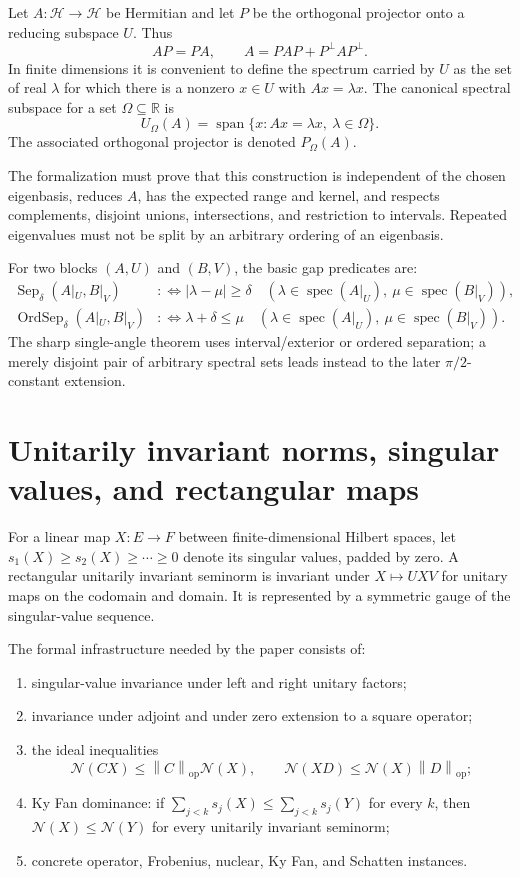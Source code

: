 \documentclass[11pt]{article}
\newcommand{\Hh}{\mathcal H}
\newcommand{\Nn}{\mathcal N}
\newcommand{\spec}{\operatorname{spec}}
\newcommand{\op}{\mathrm{op}}
\newcommand{\abs}[1]{\left|#1\right|}
\newcommand{\norm}[1]{\left\lVert#1\right\rVert}
\theoremstyle{remark}
\begin{document}
Let \(A:\Hh\to\Hh\) be Hermitian and let \(P\) be the orthogonal projector
onto a reducing subspace \(U\).  Thus
\[
  AP=PA, \qquad A=PAP+P^\perp A P^\perp.
\]
In finite dimensions it is convenient to define the spectrum carried by
\(U\) as the set of real \(\lambda\) for which there is a nonzero
\(x\in U\) with \(Ax=\lambda x\).  The canonical spectral subspace for a set
\(\Omega\subseteq\mathbb R\) is
\[
  U_\Omega(A)=\operatorname{span}\{x:Ax=\lambda x,\ \lambda\in\Omega\}.
\]
The associated orthogonal projector is denoted \(P_\Omega(A)\).

The formalization must prove that this construction is independent of the
chosen eigenbasis, reduces \(A\), has the expected range and kernel, and
respects complements, disjoint unions, intersections, and restriction to
intervals.  Repeated eigenvalues must not be split by an arbitrary ordering of
an eigenbasis.

For two blocks \((A,U)\) and \((B,V)\), the basic gap predicates are:
\begin{align*}
  \operatorname{Sep}_\delta(A|_U,B|_V)
    &:\Longleftrightarrow
      \abs{\lambda-\mu}\ge\delta
      \quad(\lambda\in\spec(A|_U),\ \mu\in\spec(B|_V)),\\
  \operatorname{OrdSep}_\delta(A|_U,B|_V)
    &:\Longleftrightarrow
      \lambda+\delta\le\mu
      \quad(\lambda\in\spec(A|_U),\ \mu\in\spec(B|_V)).
\end{align*}
The sharp single-angle theorem uses interval/exterior or ordered separation;
a merely disjoint pair of arbitrary spectral sets leads instead to the later
\(\pi/2\)-constant extension.

\section{Unitarily invariant norms, singular values, and rectangular maps}

For a linear map \(X:E\to F\) between finite-dimensional Hilbert spaces, let
\(s_1(X)\ge s_2(X)\ge\cdots\ge0\) denote its singular values, padded by zero.
A rectangular unitarily invariant seminorm is invariant under
\(X\mapsto UXV\) for unitary maps on the codomain and domain.  It is represented
by a symmetric gauge of the singular-value sequence.

The formal infrastructure needed by the paper consists of:
\begin{enumerate}
\item singular-value invariance under left and right unitary factors;
\item invariance under adjoint and under zero extension to a square operator;
\item the ideal inequalities
\[
  \Nn(CX)\le \norm{C}_{\op}\Nn(X),\qquad
  \Nn(XD)\le \Nn(X)\norm{D}_{\op};
\]
\item Ky Fan dominance: if
\(\sum_{j<k}s_j(X)\le\sum_{j<k}s_j(Y)\) for every \(k\), then
\(\Nn(X)\le\Nn(Y)\) for every unitarily invariant seminorm;
\item concrete operator, Frobenius, nuclear, Ky Fan, and Schatten instances.
\end{enumerate}
\end{document}
